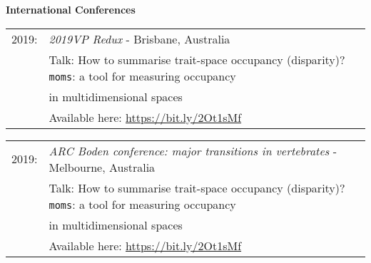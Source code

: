 \documentclass[10pt,a4paper]{article}
\begin{document}
{\bigskip

\raggedright\textbf{International Conferences}\\[1.5ex]


\begin{tabular}{ll}
2019: & \textit{2019VP Redux} - Brisbane, Australia\\
      & Talk: How to summarise trait-space occupancy (disparity)? \texttt{moms}: a tool for measuring occupancy\\
      & in multidimensional spaces\\
      & Available here: \href{https://figshare.com/articles/Shifting_spaces_which_disparity_or_dissimilarity_metrics_best_summarise_occupancy_in_multidimensional_spaces_/9922961}{https://bit.ly/2Ot1sMf}\\
\end{tabular}
\begin{tabular}{ll}    
2019: & \textit{ARC Boden conference: major transitions in vertebrates} - Melbourne, Australia\\
      & Talk: How to summarise trait-space occupancy (disparity)? \texttt{moms}: a tool for measuring occupancy\\
      & in multidimensional spaces\\
      & Available here: \href{https://figshare.com/articles/Shifting_spaces_which_disparity_or_dissimilarity_metrics_best_summarise_occupancy_in_multidimensional_spaces_/9922961}{https://bit.ly/2Ot1sMf}\\

\end{tabular}}
\end{document}
